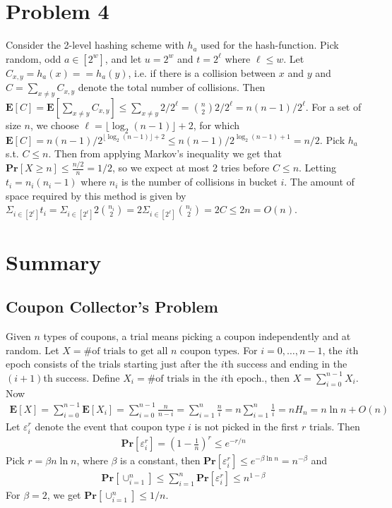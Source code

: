 \documentclass[12pt]{article}
\begin{document}
\section*{Problem 4}
Consider the 2-level hashing scheme with $h_a$ used for the hash-function. Pick random, odd $a \in [2^w]$, and let $u = 2^w$ and $t = 2^\ell$ where $\ell \leq w$. Let $C_{x,y} = h_a(x) == h_a(y)$, i.e. if there is a collision between $x$ and $y$ and $C = \sum_{x \neq y} C_{x,y}$ denote the total number of collisions. Then $\mathbf{E} \left[ C \right] = \mathbf{E}\left[ \sum_{x \neq y} C_{x,y} \right] \leq \sum_{x \neq y} 2/2^{\ell} = \binom{n}{2}2/2^\ell = n(n-1)/2^\ell$. For a set of size $n$, we choose $\ell = \lfloor \log_2(n-1) \rfloor + 2$, for which $\mathbf{E}[C] = n(n-1)/2^{\lfloor \log_2(n-1) \rfloor + 2} \leq n(n-1)/2^{\log_2(n-1) + 1} = n/2$. Pick $h_a$ s.t. $C \leq n$. Then from applying Markov's inequality we get that $\mathbf{Pr}[X \geq n] \leq \frac{n/2}{n} = 1/2$, so we expect at most 2 tries before $C \leq n$. Letting $t_i = n_i(n_i-1)$ where $n_i$ is the number of collisions in bucket $i$. The amount of space required by this method is given by $\Sigma_{i \in [2^\ell]}t_i = \Sigma_{i \in [2^\ell]} 2 \binom{n_i}{2} = 2 \Sigma_{i \in [2^\ell]} \binom{n_i}{2} = 2C \leq 2n = O(n)$.



\pagebreak

\section*{Summary}
\subsection*{Coupon Collector's Problem}
Given $n$ types of coupons, a trial means picking a coupon independently and at random. Let $X = \text{\# of trials to get all } n \text{ coupon types}$. For $i=0, \hdots, n-1$, the $i$th epoch consists of the trials starting just after the $i$th success and ending in the $(i+1)$th success. Define $X_i = \text{\# of trials in the } i\text{th epoch.}$, then $X=\sum_{i=0}^{n-1} X_i$. Now
\begin{align*}
\mathbf{E}\left[ X \right] = \sum_{i=0}^{n-1} \mathbf{E}\left[ X_i \right] = \sum_{i=0}^{n-1} \frac{n}{n-i} = \sum_{i=1}^{n} \frac{n}{i} =  n \sum_{i=1}^{n} \frac{1}{i} = n H_{n} = n \ln n + O(n)
\end{align*}
Let $\varepsilon_i^r$ denote the event that coupon type $i$ is not picked in the first $r$ trials. Then
\begin{align*}
\mathbf{Pr}\left[ \varepsilon_i^r \right] = \left(1-\frac{1}{n}\right)^r \leq e^{-r/n}
\end{align*}
Pick $r=\beta n \ln n$, where $\beta$ is a constant, then $\mathbf{Pr}\left[ \varepsilon_i^r \right] \leq e^{-\beta \ln n} = n^{-\beta}$ and
\begin{align*}
\mathbf{Pr}\left[ \cup_{i=1}^n \right] \leq \sum_{i=1}^n \mathbf{Pr}\left[ \varepsilon_i^r \right] \leq n^{1-\beta}
\end{align*}
For $\beta=2$, we get $\mathbf{Pr}\left[ \cup_{i=1}^n \right] \leq 1/n$.
\end{document}
